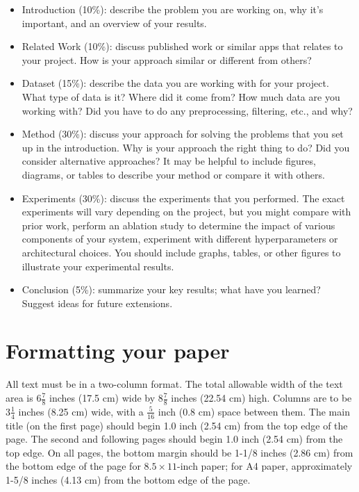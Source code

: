 \documentclass[10pt,twocolumn,letterpaper]{article}
\begin{document}
\begin{itemize}
	\item Introduction (10\%): describe the problem you are working on, why it's important, and an overview of your results.
	\item Related Work (10\%): discuss published work or similar apps that relates to your project. How is your approach similar or different from others? 

	\item Dataset (15\%): describe the data you are working with for your project. What type of data is it? Where did it come from? How much data are you working with? Did you have to do any preprocessing, filtering, etc., and why?
	\item Method (30\%): discuss your approach for solving the problems that you set up in the introduction. Why is your approach the right thing to do? Did you consider alternative approaches? It may be helpful to include figures, diagrams, or tables to describe your method or compare it with others.
	\item Experiments (30\%): discuss the experiments that you performed. The exact experiments will vary depending on the project, but you might compare with prior work, perform an ablation study to determine the impact of various components of your system, experiment with different hyperparameters or architectural choices. You should include graphs, tables, or other figures to illustrate your experimental results.
	\item Conclusion (5\%): summarize your key results; what have you learned? Suggest ideas for future extensions.
\end{itemize}	

\section{Formatting your paper}

All text must be in a two-column format. The total allowable width of the
text area is $6\frac78$ inches (17.5 cm) wide by $8\frac78$ inches (22.54
cm) high. Columns are to be $3\frac14$ inches (8.25 cm) wide, with a
$\frac{5}{16}$ inch (0.8 cm) space between them. The main title (on the
first page) should begin 1.0 inch (2.54 cm) from the top edge of the
page. The second and following pages should begin 1.0 inch (2.54 cm) from
the top edge. On all pages, the bottom margin should be 1-1/8 inches (2.86
cm) from the bottom edge of the page for $8.5 \times 11$-inch paper; for A4
paper, approximately 1-5/8 inches (4.13 cm) from the bottom edge of the
page.
\end{document}
